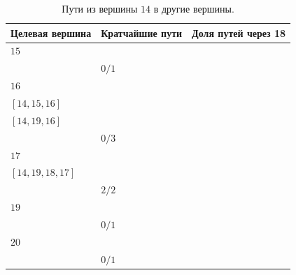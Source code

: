 \documentclass[12pt, a4paper]{extarticle}
\begin{document}
\begin{table}[h!]
    \caption{Пути из вершины $14$ в другие вершины.}
    \label{tbl:10-14}
    \begin{tabularx}{\textwidth}{|X|X|X|}
        \hline 
        Целевая вершина & Кратчайшие пути & Доля путей через 18 \\
        \hline 
        $15$ & \begin{tabular}{@{}l@{}} $[14, 15]$ \\ \end{tabular} & $0/1$ \\
        \hline
        $16$ & \begin{tabular}{@{}l@{}} $[14, 10, 16]$ \\  $[14, 15, 16]$ \\  $[14, 19, 16]$ \\ \end{tabular} & $0/3$ \\
        \hline
        $17$ & \begin{tabular}{@{}l@{}} $[14, 15, 18, 17]$ \\  $[14, 19, 18, 17]$ \\ \end{tabular} & $2/2$ \\
        \hline
        $19$ & \begin{tabular}{@{}l@{}} $[14, 19]$ \\ \end{tabular} & $0/1$ \\
        \hline
        $20$ & \begin{tabular}{@{}l@{}} $[14, 19, 20]$ \\ \end{tabular} & $0/1$ \\
        \hline
    \end{tabularx}
\end{table}
\end{document}
